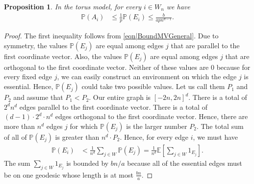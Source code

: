 \documentclass[reqno]{amsart}
\newtheorem{proposition}{Proposition}
\begin{document}
\begin{proposition}\label{thm|BoundMVTorus} In the torus model, for every $i\in W_n$ we have 
\begin{align}
\mathbb P\left(A_i\right)&\leq \frac1{  p}\mathbb P(E_i)\leq\frac{b}{apn^{d-1}}.   \label{eqn|BoundMVTorus}
\end{align}
\end{proposition}

\begin{proof} The first inequality follows from \eqref{eqn|BoundMVGeneral}. 
Due to symmetry, the values $\mathbb P(E_j)$ are equal among edges $j$ that are parallel to the first coordinate vector. Also, the values $\mathbb P(E_j)$ are equal among edges $j$ that are orthogonal to the first coordinate vector. Neither of these values are $0$ because for every fixed edge $j$, we can easily construct an environment on which the edge $j$ is essential. Hence, $\mathbb P(E_j)$ could take two possible values. Let us call them $P_1$ and $P_2$ and assume that $P_1<P_2$. Our entire graph is $[-2n,2n]^d$. There is a total of $2^dn^d$ edges parallel to the first coordinate vector. There is a total of $(d-1)\cdot 2^d\cdot n^d$ edges orthogonal to the first coordinate vector. Hence, there are more than $n^d$ edges $j$ for which $\mathbb P(E_j)$ is the larger number $P_2$.
The total sum of all of $\mathbb P(E_j)$ is greater than $n^d\cdot P_2$. Hence, for every edge $i$, we must have 
\begin{align*}
\mathbb P(E_i)&< \frac1{n^d}\sum_{j\in W}\mathbb P(E_j)=\frac1{n^d}\mathbb E\left[\sum_{j\in W}1_{E_j}\right].
\end{align*}
The sum $\sum_{j\in W}1_{E_j}$ is bounded by $bn/a$ because all of the essential edges must be on one geodesic whose length is at most $\frac{bn}a$.
\end{proof}
 
\end{document}
